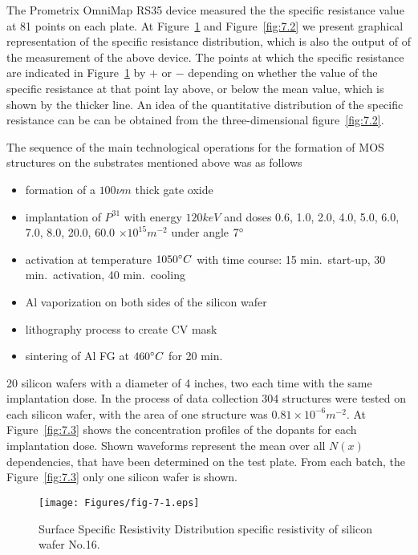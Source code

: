 The Prometrix OmniMap RS35 device measured the the specific resistance
value at 81 points on each plate. At Figure~\ref{fig:7.1} and
Figure~\ref{fig:7.2} we present graphical representation of the
specific resistance distribution, which is also the output of of the
measurement of the above device. The points at which the specific
resistance are indicated in Figure~\ref{fig:7.1} by $+$ or $-$
depending on whether the value of the specific resistance at that
point lay above, or below the mean value, which is shown by the
thicker line.  An idea of the quantitative distribution of the
specific resistance can be can be obtained from the three-dimensional
figure~\ref{fig:7.2}.

The sequence of the main technological operations for the formation of
MOS structures on the substrates mentioned above was as follows

\begin{itemize}
\item formation of a $100 \nu m$ thick gate oxide
\item implantation of $P^{31}$ with energy $120 keV$ and doses 0.6,
  1.0, 2.0, 4.0, 5.0, 6.0, 7.0, 8.0, 20.0, 60.0 $\times 10^{15}
  m^{-2}$ under angle $7\degree$
\item activation at temperature $1050 \degree C$ with time course: 15
  min.\ start-up, 30 min.\ activation, 40 min.\ cooling
\item Al vaporization on both sides of the silicon wafer
\item lithography process to create CV mask
\item sintering of Al FG at $460 \degree C$ for 20 min.
\end{itemize}

20 silicon wafers with a diameter of 4 inches, two each time with the
same implantation dose. In the process of data collection 304
structures were tested on each silicon wafer, with the area of one
structure was $0.81 \times 10^{-6} m^{-2}$. At Figure~\ref{fig:7.3}
shows the concentration profiles of the dopants for each implantation
dose. Shown waveforms represent the mean over all $N(x)$ dependencies,
that have been determined on the test plate. From each batch, the
Figure~\ref{fig:7.3} only one silicon wafer is shown.

\newpage
\begin{figure}[h!]\centering
  \texttt{[image: Figures/fig-7-1.eps]}%
  \caption[Area distribution of surface specific resistance of silicon
    wafer No.16]{Surface Specific Resistivity Distribution specific
    resistivity of silicon wafer No.16.}\label{fig:7.1}
\end{figure}

